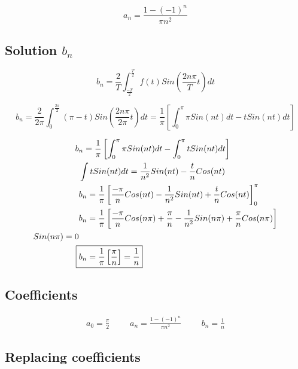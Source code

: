 \documentclass{article}
\begin{document}
\begin{equation}
    \boxed{ a_n=\frac{1-(-1)^n}{\pi n^2}}
\end{equation}

\subsection{Solution $b_n$}

\begin{equation}
    b_n=\frac{2}{T} \int_{\frac{-T}{2}}^{\frac{T}{2}}f(t)Sin \left ( \frac{2 n \pi}{T}t\right )dt
\end{equation}

\begin{equation}
b_n=\frac{2}{2 \pi} \int_{0}^{\frac{2 \pi}{2}}(\pi -t)Sin \left ( \frac{2 n \pi}{2 \pi}t\right )dt=\frac{1}{\pi}\left [ \int_{0}^{\pi} \pi Sin(nt)dt -tSin(nt)dt \right]
\end{equation}

\begin{align*}
b&_n=\frac{1}{\pi}\left [ \int_{0}^{\pi} \pi Sin(nt)dt -\int_{0}^{\pi}tSin(nt)dt \right]\\
&\int tSin(nt)dt=\frac{1}{n^2}Sin(nt)-\frac{t}{n}Cos(nt)\\
&b_n=\frac{1}{\pi}\left [ \frac{-\pi}{n}Cos(nt)-\frac{1}{n^2}Sin(nt)+\frac{t}{n}Cos(nt) \right]_{0}^{\pi}\\
&b_n=\frac{1}{\pi}\left [ \frac{-\pi}{n}Cos(n \pi)+\frac{\pi}{n}-\frac{1}{n^2}Sin(n \pi)+\frac{\pi}{n}Cos(n \pi) \right]\\
Sin(n \pi) =0 \\
\Aboxed{&b_n=\frac{1}{\pi}\left [ \frac{\pi}{n} \right]=\frac{1}{n}}
\end{align*}

\subsection{Coefficients}

\begin{equation}
    \begin{matrix}
a_0=\frac{\pi}{2} &&& a_n=\frac{1-(-1)^n}{\pi n^2} &&&b_n=\frac{1}{n}
\end{matrix}
\end{equation}

\subsection{Replacing coefficients}
\end{document}

